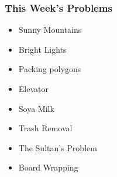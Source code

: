 \begin{frame}
  \frametitle{This Week's Problems}
  \begin{itemize}
    \item Sunny Mountains
    \item Bright Lights
    \item Packing polygons
    \item Elevator
    \item Soya Milk
    \item Trash Removal
    \item The Sultan's Problem
    \item Board Wrapping
  \end{itemize}
\end{frame}
